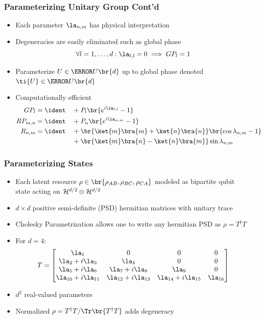 \documentclass[
    hyperref={colorlinks=true, linkcolor=blue, urlcolor=blue, citecolor=MidnightBlue},
    xcolor={dvipsnames},
]{beamer}
\renewcommand{\term}[1]{\textcolor{Mahogany}{#1}}
\begin{document}
\begin{frame}
    \frametitle{Parameterizing Unitary Group Cont'd}
    \begin{itemize}
        \item Each parameter $\la_{n,m}$ has physical interpretation
        \item Degeneracies are easily eliminated such as global phase
        \[ \forall l = 1, \ldots, d : \la_{l,l} = 0 \implies GP_{l} = 1 \]
        \item Parameterize $U \in \s{U}\br{d}$ up to global phase denoted $\ti{U} \in \s{U}\br{d}$
        \item Computationally efficient
        \begin{alignat*}{2}
            GP_l &= \ident &&+ P_l \br{e^{i\la_{l,l}} - 1} \\
            RP_{m,n} &= \ident &&+ P_n \br{e^{i\la_{n,m}} - 1} \\
            R_{n,m} &= \ident &&+ \br{\ket{m}\bra{m} + \ket{n}\bra{n}} \br{\cos\lambda_{n,m} - 1} \\
            & &&+ \br{\ket{m}\bra{n} - \ket{n}\bra{m}} \sin\lambda_{n,m} \\
        \end{alignat*}
    \end{itemize}
\end{frame}

\begin{frame}
    \frametitle{Parameterizing States}
    \begin{itemize}
        \item Each latent resource $\rho \in \br{\rho_{AB}, \rho_{BC}, \rho_{CA}}$ modeled as bipartite qubit state acting on $\mathcal{H}^{d/2} \otimes \mathcal{H}^{d/2}$
        \item $d \times d$ positive semi-definite (PSD) hermitian matrices with unitary trace
        \item \term{Cholesky Parametrization} allows one to write any hermitian PSD as $\rho = T^{\dagger} T$
        \item For $d = 4$:
        \[ T = \begin{bmatrix}\la_{1}&0&0&0\\\la_{2} + i \la_{3}&\la_{4}&0&0\\\la_{5} + i \la_{6}&\la_{7} + i \la_{8}&\la_{9}&0\\\la_{10} + i \la_{11}&\la_{12} + i \la_{13}&\la_{14} + i \la_{15}&\la_{16}\end{bmatrix} \]
        \item $d^2$ real-valued parameters
        \item Normalized $\rho = {T^{\dagger}T}/{\Tr\br{T^{\dagger} T}}$ adds degeneracy
    \end{itemize}
\end{frame}
\end{document}
